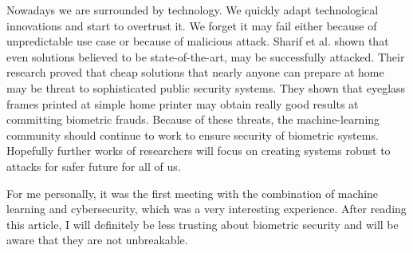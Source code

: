 Nowadays we are surrounded by technology. We quickly adapt technological innovations and start to overtrust it. We forget it may fail either because of unpredictable use case or because of malicious attack. Sharif et al. shown that even solutions believed to be  state-of-the-art, may be successfully attacked. Their research proved that cheap solutions that nearly anyone can prepare at home may be threat to sophisticated public security systems. They shown that eyeglass frames printed at simple home printer may obtain really good results at committing biometric frauds. Because of these threats, the machine-learning community should continue to work to ensure security of biometric systems. Hopefully further works of researchers will focus on creating systems robust to attacks for safer future for all of us. 

For me personally, it was the first meeting with the combination of machine learning and cybersecurity, which was a very interesting experience. After reading this article, I will definitely be less trusting about biometric security and will be aware that they are not unbreakable.